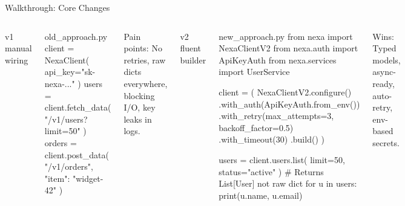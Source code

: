 \documentclass[10pt,aspectratio=169]{beamer}
\begin{document}
\begin{frame}[fragile]{Walkthrough: Core Changes}

  \begin{columns}[T,onlytextwidth]
    {\small\color{textMuted}\faArrowRight\hspace{4pt} v1 \textemdash{} manual wiring}
    \vspace{4pt}
    \begin{codeblock}{old\_approach.py}
client = NexaClient(
    api_key="sk-nexa-..."
)
users = client.fetch_data(
    "/v1/users?limit=50"
)
orders = client.post_data(
    "/v1/orders",
    {"item": "widget-42"}
)
\end{codeblock}

    \vspace{6pt}
    \begin{infocard}
      {\small\faTimesCircle\hspace{4pt}\color{accentRed}Pain points:} No retries, raw dicts everywhere, blocking I/O, key leaks in logs.
    \end{infocard}

    {\small\color{accentCyan}\faArrowRight\hspace{4pt} v2 \textemdash{} fluent builder}
    \vspace{4pt}
    \begin{codeblock}{new\_approach.py}
from nexa import NexaClientV2
from nexa.auth import ApiKeyAuth
from nexa.services import UserService

client = (
    NexaClientV2.configure()
    .with_auth(ApiKeyAuth.from_env())
    .with_retry(max_attempts=3,
                backoff_factor=0.5)
    .with_timeout(30)
    .build()
)

users = client.users.list(
    limit=50, status="active"
)
# Returns List[User] not raw dict
for u in users:
    print(u.name, u.email)
\end{codeblock}

    \vspace{6pt}
    \begin{infocard}
      {\small\faCheckCircle\hspace{4pt}\color{accentCyan}Wins:} Typed models, async-ready, auto-retry, env-based secrets.
    \end{infocard}
  \end{columns}

\end{frame}
\end{document}
